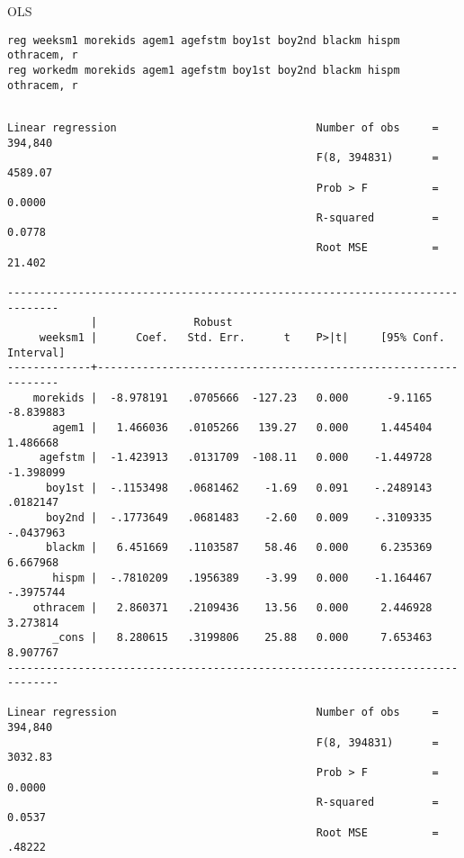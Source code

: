 \documentclass[cache=false]{article}
\begin{document}
OLS
\begin{verbatim}
reg weeksm1 morekids agem1 agefstm boy1st boy2nd blackm hispm othracem, r
reg workedm morekids agem1 agefstm boy1st boy2nd blackm hispm othracem, r
\end{verbatim}

\begin{verbatim}

Linear regression                               Number of obs     =    394,840
                                                F(8, 394831)      =    4589.07
                                                Prob > F          =     0.0000
                                                R-squared         =     0.0778
                                                Root MSE          =     21.402

------------------------------------------------------------------------------
             |               Robust
     weeksm1 |      Coef.   Std. Err.      t    P>|t|     [95% Conf. Interval]
-------------+----------------------------------------------------------------
    morekids |  -8.978191   .0705666  -127.23   0.000      -9.1165   -8.839883
       agem1 |   1.466036   .0105266   139.27   0.000     1.445404    1.486668
     agefstm |  -1.423913   .0131709  -108.11   0.000    -1.449728   -1.398099
      boy1st |  -.1153498   .0681462    -1.69   0.091    -.2489143    .0182147
      boy2nd |  -.1773649   .0681483    -2.60   0.009    -.3109335   -.0437963
      blackm |   6.451669   .1103587    58.46   0.000     6.235369    6.667968
       hispm |  -.7810209   .1956389    -3.99   0.000    -1.164467   -.3975744
    othracem |   2.860371   .2109436    13.56   0.000     2.446928    3.273814
       _cons |   8.280615   .3199806    25.88   0.000     7.653463    8.907767
------------------------------------------------------------------------------

Linear regression                               Number of obs     =    394,840
                                                F(8, 394831)      =    3032.83
                                                Prob > F          =     0.0000
                                                R-squared         =     0.0537
                                                Root MSE          =     .48222


\end{verbatim}
\end{document}
